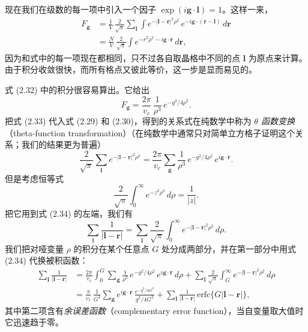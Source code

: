 现在我们在级数的每一项中引入一个因子 $\exp(i\boldsymbol{g}\cdot\boldsymbol{l})=1$。这样一来，
\begin{align*}
F_{\boldsymbol{g}} &= \frac{1}{V}\,\frac{2}{\sqrt{\pi}}\sum_{\boldsymbol{l}}\int e^{-|\boldsymbol{l}-\mathbf{r}|^2\rho^2}\, e^{-i\boldsymbol{g}\cdot(\mathbf{r}-\boldsymbol{l})}\, d\mathbf{r} \\
&= \frac{N}{V}\,\frac{2}{\sqrt{\pi}}\int e^{-r^2\rho^2-i\boldsymbol{g}\cdot\mathbf{r}}\, d\mathbf{r},
\tag{2.32}
\end{align*}
因为和式中的每一项现在都相同，只不过各自取晶格中不同的点 $\boldsymbol{l}$ 为原点来计算。由于积分收敛很快，而所有格点又彼此等价，这一步是显而易见的。

式 (2.32) 中的积分很容易算出。它给出
\begin{equation*}
F_{\boldsymbol{g}} = \frac{2\pi}{v_c}\,\frac{1}{\rho^3}\, e^{-g^2/4\rho^2}.
\tag{2.33}
\end{equation*}
把式 (2.33) 代入式 (2.29) 和 (2.30)，得到的关系式在纯数学中称为 \emph{$\theta$ 函数变换}（theta-function transformation）（在纯数学中通常只对简单立方格子证明这个关系；我们的结果更为普遍）
\begin{equation*}
\frac{2}{\sqrt{\pi}}\sum_{\boldsymbol{l}} e^{-|\boldsymbol{l}-\mathbf{r}|^2\rho^2} = \frac{2\pi}{v_c}\sum_{\boldsymbol{g}}\frac{1}{\rho^3}\, e^{-g^2/4\rho^2}\, e^{i\boldsymbol{g}\cdot\mathbf{r}}.
\tag{2.34}
\end{equation*}
但是考虑恒等式
\begin{equation*}
\frac{2}{\sqrt{\pi}}\int_0^\infty e^{-z^2\rho^2}\, d\rho = \frac{1}{|z|}.
\tag{2.35}
\end{equation*}
把它用到式 (2.34) 的左端，我们有
\begin{equation*}
\sum_{\boldsymbol{l}}\frac{1}{|\boldsymbol{l}-\mathbf{r}|} = \sum_{\boldsymbol{l}}\frac{2}{\sqrt{\pi}}\int_0^\infty e^{-|\boldsymbol{l}-\mathbf{r}|^2\rho^2}\, d\rho.
\tag{2.36}
\end{equation*}
我们把对哑变量 $\rho$ 的积分在某个任意点 $G$ 处分成两部分，并在第一部分中用式 (2.34) 代换被积函数：
\begin{align*}
\sum_{\boldsymbol{l}}\frac{1}{|\boldsymbol{l}-\mathbf{r}|} &= \frac{2\pi}{v_c}\int_0^G \sum_{\boldsymbol{g}}\frac{1}{\rho^3}\, e^{-g^2/4\rho^2}\, e^{i\boldsymbol{g}\cdot\mathbf{r}}\, d\rho + \sum_{\boldsymbol{l}}\frac{2}{\sqrt{\pi}}\int_G^\infty e^{-|\boldsymbol{l}-\mathbf{r}|^2\rho^2}\, d\rho \\
&= \frac{\pi}{v_c}\,\frac{1}{G^2}\sum_{\boldsymbol{g}} e^{i\boldsymbol{g}\cdot\mathbf{r}}\,\frac{e^{-g^2/4G^2}}{g^2/4G^2} + \sum_{\boldsymbol{l}}\frac{1}{|\boldsymbol{l}-\mathbf{r}|}\,\mathrm{erfc}\{G|\boldsymbol{l}-\mathbf{r}|\},
\tag{2.37}
\end{align*}
其中第二项含有\emph{余误差函数}（complementary error function），当自变量取大值时它迅速趋于零。

